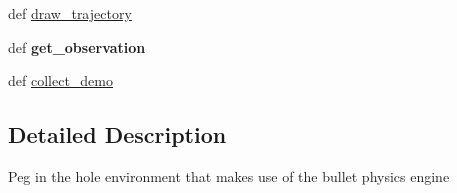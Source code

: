 \begin{DoxyCompactItemize}
\item 
def \hyperlink{classaml__playground_1_1peg__in__hole_1_1pih__worlds_1_1bullet_1_1pih__world_1_1_p_i_h_world_a4be9e3a0649764ceffed4d762db59b57}{draw\-\_\-trajectory}
\item 
\hypertarget{classaml__playground_1_1peg__in__hole_1_1pih__worlds_1_1bullet_1_1pih__world_1_1_p_i_h_world_a5c7526228d08176bcd2797f6b6d57a1d}{def {\bfseries get\-\_\-observation}}\label{classaml__playground_1_1peg__in__hole_1_1pih__worlds_1_1bullet_1_1pih__world_1_1_p_i_h_world_a5c7526228d08176bcd2797f6b6d57a1d}

\item 
def \hyperlink{classaml__playground_1_1peg__in__hole_1_1pih__worlds_1_1bullet_1_1pih__world_1_1_p_i_h_world_ae1ac8f9db87c00650b6e8764f8760bfa}{collect\-\_\-demo}
\end{DoxyCompactItemize}


\subsection{Detailed Description}
\begin{DoxyVerb}Peg in the hole environment that makes use of the bullet physics engine
\end{DoxyVerb}
 


